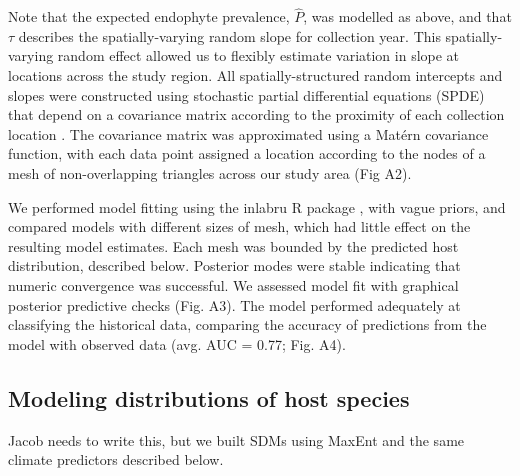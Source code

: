 \documentclass[11pt]{article}
\begin{document}
Note that the expected endophyte prevalence, $\hat{P}$, was modelled as above, and that $\tau$ describes the spatially-varying random slope for collection year.
This spatially-varying random effect allowed us to flexibly estimate variation in slope at locations across the study region.
All spatially-structured random intercepts and slopes were constructed using stochastic partial differential equations (SPDE) that depend on a covariance matrix according to the proximity of each collection location \citep{lindgren2011explicit,bakka2018spatial}. 
The covariance matrix was approximated using a Matérn covariance function, with each data point assigned a location according to the nodes of a mesh of non-overlapping triangles across our study area (Fig A2).


We performed model fitting using the inlabru R package \citep{}, with vague priors, and compared models with different sizes of mesh, which had little effect on the resulting model estimates.
Each mesh was bounded by the predicted host distribution, described below.
Posterior modes were stable indicating that numeric convergence was successful.
We assessed model fit with graphical posterior predictive checks (Fig. A3).
The model performed adequately at classifying the historical data, comparing the accuracy of predictions from the model with observed data (avg. AUC = 0.77; Fig. A4). 

\subsection*{Modeling distributions of host species}

Jacob needs to write this, but we built SDMs using MaxEnt and the same climate predictors described below. 
\end{document}

